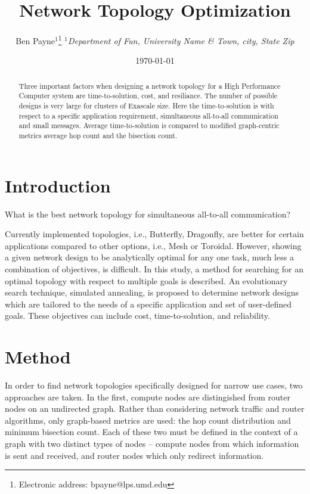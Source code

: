 \documentclass[pdftex]{article}
\begin{document}
\title{Network Topology Optimization}

\author{Ben Payne$^{1}$\footnote{Electronic address: bpayne@lps.umd.edu}
{\it $^{1}$Department of Fun, University Name \& Town, city, State Zip}}

\date{\today}

\begin{abstract}
Three important factors when designing a network topology for a High Performance Computer system are time-to-solution, cost, and resiliance. The number of possible designs is very large for clusters of Exascale size. Here the time-to-solution is with respect to a specific application requirement, simultaneous all-to-all communication and small messages. Average time-to-solution is compared to modified graph-centric metrics average hop count and the bisection count.
\end{abstract}


\tableofcontents


\section{Introduction}

What is the best network topology for simultaneous all-to-all communication?

Currently implemented topologies, i.e., Butterfly, Dragonfly, are better for certain applications compared to other options, i.e., Mesh or Toroidal. However, showing a given network design to be analytically optimal for any one task, much less a combination of objectives, is difficult. In this study, a method for searching for an optimal topology with respect to multiple goals is described. An evolutionary search technique, simulated annealing, is proposed to determine network designs which are tailored to the needs of a specific application and set of user-defined goals. These objectives can include cost, time-to-solution, and reliability.

\section{Method}

In order to find network topologies specifically designed for narrow use cases, two approaches are taken. In the first, compute nodes are distingished from router nodes on an undirected graph. Rather than considering network traffic and router algorithms, only graph-based metrics are used: the hop count distribution and minimum bisection count. Each of these two must be defined in the context of a graph with two distinct types of nodes -- compute nodes from which information is sent and received, and router nodes which only redirect information. 
\end{document}
